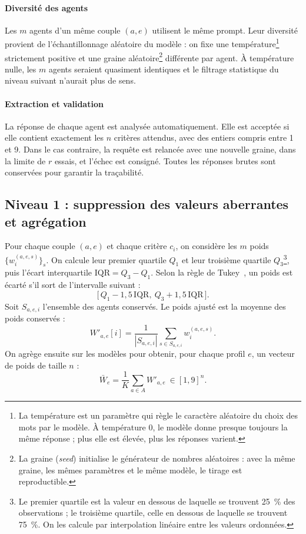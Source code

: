 \documentclass[11pt,a4paper]{article}
\newcommand{\Wbar}{\bar{W}}
\begin{document}
\paragraph{Diversité des agents} Les $m$ agents d'un même couple $(a,e)$ utilisent le même prompt. Leur diversité provient de l'échantillonnage aléatoire du modèle : on fixe une température\footnote{La température est un paramètre qui règle le caractère aléatoire du choix des mots par le modèle. À température 0, le modèle donne presque toujours la même réponse ; plus elle est élevée, plus les réponses varient.} strictement positive et une graine aléatoire\footnote{La graine (\emph{seed}) initialise le générateur de nombres aléatoires : avec la même graine, les mêmes paramètres et le même modèle, le tirage est reproductible.} différente par agent. À température nulle, les $m$ agents seraient quasiment identiques et le filtrage statistique du niveau suivant n'aurait plus de sens.

\paragraph{Extraction et validation} La réponse de chaque agent est analysée automatiquement. Elle est acceptée si elle contient exactement les $n$ critères attendus, avec des entiers compris entre 1 et 9. Dans le cas contraire, la requête est relancée avec une nouvelle graine, dans la limite de $r$ essais, et l'échec est consigné. Toutes les réponses brutes sont conservées pour garantir la traçabilité.

\subsection{Niveau 1 : suppression des valeurs aberrantes et agrégation}

Pour chaque couple $(a,e)$ et chaque critère $c_i$, on considère les $m$ poids $\{w_i^{(a,e,s)}\}_s$. On calcule leur premier quartile $Q_1$ et leur troisième quartile $Q_3$\footnote{Le premier quartile est la valeur en dessous de laquelle se trouvent 25~\% des observations ; le troisième quartile, celle en dessous de laquelle se trouvent 75~\%. On les calcule par interpolation linéaire entre les valeurs ordonnées.}, puis l'écart interquartile $\mathrm{IQR}=Q_3-Q_1$. Selon la règle de Tukey~\cite{tukey}, un poids est écarté s'il sort de l'intervalle suivant :
\begin{equation}\label{eq:iqr}
  \bigl[\,Q_1-1{,}5\,\mathrm{IQR},\ Q_3+1{,}5\,\mathrm{IQR}\,\bigr].
\end{equation}
Soit $S_{a,e,i}$ l'ensemble des agents conservés. Le poids ajusté est la moyenne des poids conservés :
\begin{equation}\label{eq:wprime}
  W'_{a,e}[i]=\frac{1}{|S_{a,e,i}|}\sum_{s\in S_{a,e,i}} w_i^{(a,e,s)} .
\end{equation}
On agrège ensuite sur les modèles pour obtenir, pour chaque profil $e$, un vecteur de poids de taille $n$ :
\begin{equation}\label{eq:wbar}
  \Wbar_e=\frac{1}{K}\sum_{a\in A} W'_{a,e}\ \in[1,9]^n .
\end{equation}
\end{document}
